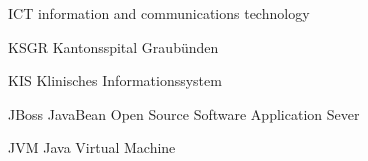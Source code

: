
\begin{abkuerzungen}[MUSTER] %
    \item[ICT] information and communications technology
    \item[KSGR] Kantonsspital Graubünden
    \item[KIS] Klinisches Informationssystem
    \item[\gls{JBoss}] JavaBean Open Source Software Application Sever
    \item[JVM] \Gls{Java} Virtual Machine
\end{abkuerzungen}